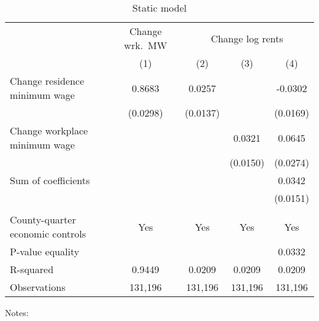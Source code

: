 \begin{table}[hbt!] \centering
    \caption{Static model}
    \label{tab:static}
    \begin{tabular}{l*{4}{c}}
        \toprule
        & \multicolumn{1}{c}{Change wrk.\ MW}
            & \multicolumn{3}{c}{Change log rents}                            \\ \cmidrule(lr){2-2}\cmidrule(lr){3-5}
                                           & (1)   & (2)   & (3)   & (4)      \\ \midrule
        Change residence minimum wage      &  0.8683  &  0.0257  &       &  -0.0302     \\
                                           & (0.0298) & (0.0137) &       & (0.0169)    \\
        Change workplace minimum wage      &       &       &  0.0321  & 0.0645      \\
                                           &       &       & (0.0150) & (0.0274)    \\ \midrule
        Sum of coefficients                &       &       &       &  0.0342     \\
                                           &       &       &       & (0.0151)    \\
                                           &       &       &       &          \\ \midrule
        County-quarter economic controls   &  Yes  & Yes   & Yes   & Yes      \\
        P-value equality                   &       &       &       & 0.0332      \\
        R-squared                          &  0.9449  &  0.0209  &  0.0209  & 0.0209      \\
        Observations                       & 131,196  & 131,196  & 131,196  & 131,196     \\\bottomrule
    \end{tabular}

    \begin{minipage}{.95\textwidth} \footnotesize
        \vspace{2mm}
        Notes: 
    \end{minipage}
\end{table}
